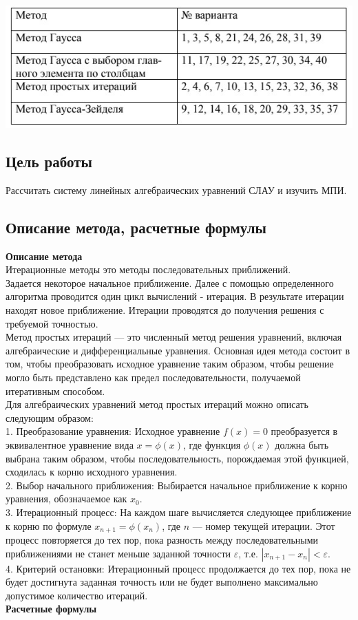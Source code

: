 \documentclass{article}
\begin{document}
\includegraphics{task.jpg}

\subsection{Цель работы}
      Рассчитать систему линейных алгебраических уравнений СЛАУ и изучить МПИ.

\subsection{Описание метода, расчетные формулы}
      \textbf{Описание метода}
      \\
      Итерационные методы это методы последовательных приближений.
      \\
      Задается некоторое начальное приближение. Далее с помощью определенного алгоритма проводится один цикл вычислений - итерация. В результате итерации находят новое приближение. Итерации проводятся до получения решения с требуемой точностью.
      \\
      Метод простых итераций — это численный метод решения уравнений, включая алгебраические и дифференциальные уравнения. Основная идея метода состоит в том, чтобы преобразовать исходное уравнение таким образом, чтобы решение могло быть представлено как предел последовательности, получаемой итеративным способом.
      \\
      Для алгебраических уравнений метод простых итераций можно описать следующим образом:
      \\
      1. Преобразование уравнения: Исходное уравнение \(f(x) = 0\) преобразуется в эквивалентное уравнение вида \(x = \phi(x)\), где функция \(\phi(x)\) должна быть выбрана таким образом, чтобы последовательность, порождаемая этой функцией, сходилась к корню исходного уравнения.
      \\
      2. Выбор начального приближения: Выбирается начальное приближение к корню уравнения, обозначаемое как \(x_0\).
      \\
      3. Итерационный процесс: На каждом шаге вычисляется следующее приближение к корню по формуле \(x_{n+1} = \phi(x_n)\), где \(n\) — номер текущей итерации. Этот процесс повторяется до тех пор, пока разность между последовательными приближениями не станет меньше заданной точности \(\varepsilon\), т.е. \(|x_{n+1} - x_n| < \varepsilon\).
      \\
      4. Критерий остановки: Итерационный процесс продолжается до тех пор, пока не будет достигнута заданная точность или не будет выполнено максимально допустимое количество итераций.
      \\
      \textbf{Расчетные формулы}
\end{document}
